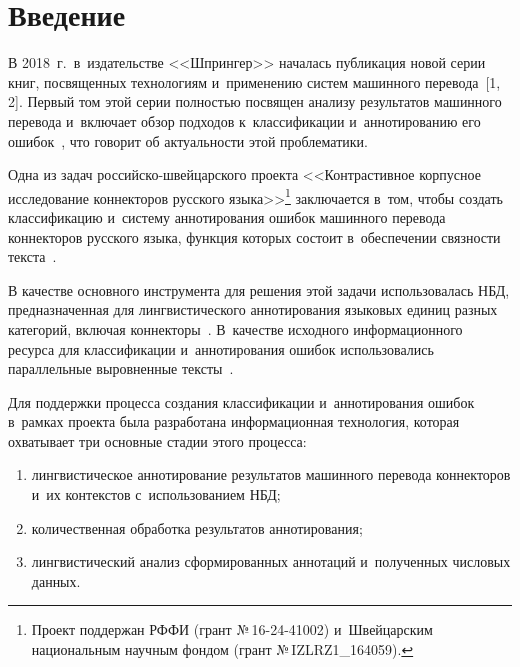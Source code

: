 \begin{multicols}{2}

\label{st\stat}

\section{Введение}

  В 2018~г.\ в~издательстве <<Шпрингер>> началась публикация новой серии 
книг, посвященных технологиям и~применению систем машинного 
перевода~[1, 2]. Первый том этой серии полностью посвящен анализу 
результатов машинного перевода и~включает обзор подходов к~классификации 
и~аннотированию его ошибок~\cite{3-gz}, что говорит об актуальности этой 
проблематики.
  
  Одна из задач рос\-сий\-ско-швей\-цар\-ско\-го проекта <<Контрастивное 
корпусное исследование коннекторов русского языка>>\footnote[5]{Проект 
поддержан РФФИ (грант №\,16-24-41002) и~Швейцарским национальным научным фондом 
(грант №\,IZLRZ1\_164059).} заключается в~том, чтобы создать классификацию 
и~систему аннотирования ошибок машинного перевода коннекторов русского 
языка, функция которых состоит в~обеспечении связности текста~\cite{4-gz}.
  
  В качестве основного инструмента для решения этой задачи использовалась 
НБД, предназначенная для лингвистического 
аннотирования языковых единиц разных категорий, включая  
коннекторы~\cite{5-gz, 6-gz, 7-gz, 8-gz}. В~качестве исходного информационного ресурса для 
классификации и~аннотирования ошибок использовались параллельные 
выровненные тексты~\cite{9-gz}.
  
  Для поддержки процесса создания классификации и~аннотирования ошибок 
  в~рамках проекта была разработана информационная технология, которая 
охватывает три основные стадии этого процесса: 
\begin{enumerate}[(1)]
\item лингвистическое 
аннотирование результатов машинного перевода коннекторов и~их контекстов 
с~использованием НБД;
\item количественная обработка результатов 
аннотирования;
\item лингвистический анализ сформированных аннотаций 
и~полученных числовых данных.
\end{enumerate}

\begin{table*}\small %
\begin{center}
\vspace*{2ex}


\end{center}
\end{table*}
\end{multicols}
